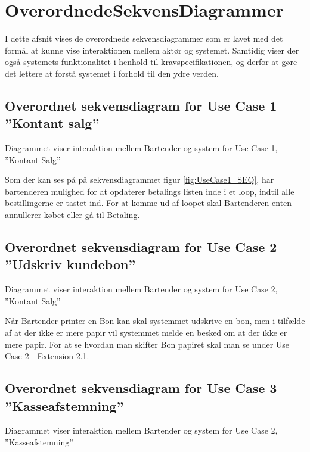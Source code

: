 
\section{OverordnedeSekvensDiagrammer}
I dette afsnit vises de overordnede sekvensdiagrammer som er lavet med det formål at kunne vise interaktionen mellem aktør og systemet. Samtidig viser der også systemets funktionalitet i henhold til kravspecifikationen, og derfor at gøre det lettere at forstå systemet i forhold til den ydre verden. 


\subsection{Overordnet sekvensdiagram for Use Case 1 ''Kontant salg''}
Diagrammet viser interaktion mellem Bartender og system for Use Case 1, ''Kontant Salg'' 


Som der kan ses på på sekvensdiagrammet figur \ref{fig:UseCase1_SEQ}, har bartenderen mulighed for at opdaterer betalings listen inde i et loop, indtil alle bestillingerne er tastet ind. For at komme ud af loopet skal Bartenderen enten annullerer købet eller gå til Betaling. 


\subsection{Overordnet sekvensdiagram for Use Case 2 ''Udskriv kundebon''}
Diagrammet viser interaktion mellem Bartender og system for Use Case 2, ''Kontant Salg'' 


Når Bartender printer en Bon kan skal systemmet udskrive en bon, men i tilfælde af at der ikke er mere papir vil systemmet melde en besked om at der ikke er mere papir.
\newline\newline
For at se hvordan man skifter Bon papiret skal man se under Use Case 2 - Extension 2.1.



\subsection{Overordnet sekvensdiagram for Use Case 3 ''Kasseafstemning''}
Diagrammet viser interaktion mellem Bartender og system for Use Case 2, ''Kasseafstemning'' 


